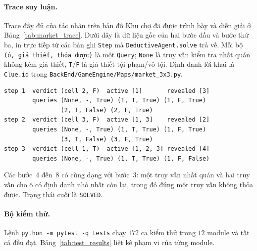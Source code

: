 \paragraph{Trace suy luận.}
Trace đầy đủ của tác nhân trên bản đồ Khu chợ đã được trình bày và diễn giải ở
Bảng~\ref{tab:market_trace}. Dưới đây là dữ liệu gốc của hai bước đầu và bước
thứ ba, in trực tiếp từ các bản ghi \texttt{Step} mà \texttt{DeductiveAgent.solve}
trả về. Mỗi bộ \texttt{(ô, giả thiết, thỏa được)} là một \texttt{Query};
\texttt{None} là truy vấn kiểm tra nhất quán không kèm giả thiết, \texttt{T}/\texttt{F}
là giả thiết tội phạm/vô tội. Định danh lời khai là \texttt{Clue.id} trong
\nolinkurl{BackEnd/GameEngine/Maps/market_3x3.py}.
\begin{verbatim}
step 1  verdict (cell 2, F)  active [1]       revealed [3]
        queries (None, -, True) (1, T, True) (1, F, True)
                (2, T, False) (2, F, True)
step 2  verdict (cell 3, F)  active [1, 3]    revealed [2]
        queries (None, -, True) (1, T, True) (1, F, True)
                (3, T, False) (3, F, True)
step 3  verdict (cell 1, T)  active [1, 2, 3] revealed [4]
        queries (None, -, True) (1, T, True) (1, F, False)
\end{verbatim}
Các bước~4 đến~8 có cùng dạng với bước~3: một truy vấn nhất quán và hai truy
vấn cho ô có định danh nhỏ nhất còn lại, trong đó đúng một truy vấn không thỏa
được. Trạng thái cuối là \texttt{SOLVED}.

\paragraph{Bộ kiểm thử.}
Lệnh \texttt{python -m pytest -q tests} chạy $172$ ca kiểm thử trong $12$
module và tất cả đều đạt. Bảng~\ref{tab:test_results} liệt kê phạm vi của từng
module.

